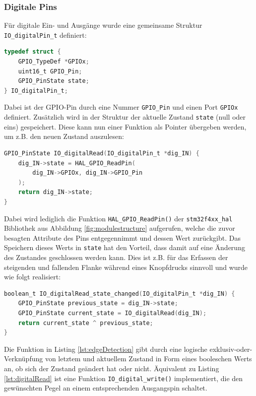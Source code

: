 \subsubsection{Digitale Pins}
Für digitale Ein- und Ausgänge wurde eine gemeinsame Struktur \verb|IO_digitalPin_t| definiert:
\begin{lstlisting}[language=C, caption={Struktur für digitale Pins}, label={lst:digitalPin}]
typedef struct {
	GPIO_TypeDef *GPIOx;
	uint16_t GPIO_Pin;
	GPIO_PinState state;
} IO_digitalPin_t;
\end{lstlisting}
Dabei ist der GPIO-Pin durch eine Nummer \verb|GPIO_Pin| und einen Port \verb|GPIOx| definiert. Zusätzlich wird in der Struktur der aktuelle Zustand \verb|state| (null oder eins) gespeichert. Diese kann nun einer Funktion als Pointer übergeben werden, um z.B. den neuen Zustand auszulesen:
\begin{lstlisting}[language=C, caption={Einlesen eines digitalen Pin-Zustands}, label={lst:digitalRead}]
GPIO_PinState IO_digitalRead(IO_digitalPin_t *dig_IN) {
	dig_IN->state = HAL_GPIO_ReadPin(
		dig_IN->GPIOx, dig_IN->GPIO_Pin
	);
	return dig_IN->state;
}
\end{lstlisting}
Dabei wird lediglich die Funktion \verb|HAL_GPIO_ReadPin()| der \verb|stm32f4xx_hal| Bibliothek aus Abbildung \ref{fig:modulestructure} aufgerufen, welche die zuvor besagten Attribute des Pins entgegennimmt und dessen Wert zurückgibt. Das Speichern dieses Werts in \verb|state| hat den Vorteil, dass damit auf eine Änderung des Zustandes geschlossen werden kann. Dies ist z.B. für das Erfassen der steigenden und fallenden Flanke während eines Knopfdrucks sinnvoll und wurde wie folgt realisiert:
\begin{lstlisting}[language=C, caption={Detektion einer Flanke}, label={lst:edgeDetection}]
boolean_t IO_digitalRead_state_changed(IO_digitalPin_t *dig_IN) {
	GPIO_PinState previous_state = dig_IN->state;
	GPIO_PinState current_state = IO_digitalRead(dig_IN);
	return current_state ^ previous_state;
}
\end{lstlisting}
Die Funktion in Listing \ref{lst:edgeDetection} gibt durch eine logische exklusiv-oder-Verknüpfung von letztem und aktuellem Zustand in Form eines booleschen Werts an, ob sich der Zustand geändert hat oder nicht. Äquivalent zu Listing \ref{lst:digitalRead} ist eine Funktion \verb|IO_digital_write()| implementiert, die den gewünschten Pegel an einem entsprechenden Ausgangspin schaltet.
